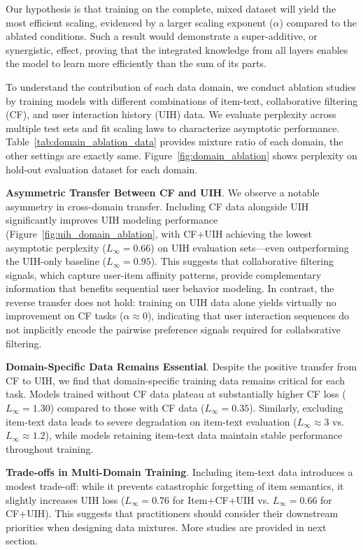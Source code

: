 \documentclass[]{fairmeta}
\begin{document}
Our hypothesis is that training on the complete, mixed dataset will yield the most efficient scaling, evidenced by a larger scaling exponent ($\alpha$) compared to the ablated conditions. Such a result would demonstrate a super-additive, or synergistic, effect, proving that the integrated knowledge from all layers enables the model to learn more efficiently than the sum of its parts.

 To understand the contribution of each data domain, we conduct ablation studies by training models with different combinations of item-text, collaborative filtering (CF), and user interaction history (UIH) data. We evaluate perplexity across multiple test sets and fit scaling laws to characterize asymptotic performance. Table~\ref{tab:domain_ablation_data} provides mixture ratio of each domain, the other settings are exactly same. Figure~\ref{fig:domain_ablation} shows perplexity on hold-out evaluation dataset for each domain.

 \textbf{Asymmetric Transfer Between CF and UIH}. We observe a notable asymmetry in cross-domain transfer. Including CF data alongside UIH significantly improves UIH modeling performance (Figure~\ref{fig:uih_domain_ablation}, with CF+UIH achieving the lowest asymptotic perplexity ($L_\infty=0.66$) on UIH evaluation sets—even outperforming the UIH-only baseline ($L_\infty=0.95$). This suggests that collaborative filtering signals, which capture user-item affinity patterns, provide complementary information that benefits sequential user behavior modeling. In contrast, the reverse transfer does not hold: training on UIH data alone yields virtually no improvement on CF tasks ($\alpha\approx 0$), indicating that user interaction sequences do not implicitly encode the pairwise preference signals required for collaborative filtering.

 \textbf{Domain-Specific Data Remains Essential}. Despite the positive transfer from CF to UIH, we find that domain-specific training data remains critical for each task. Models trained without CF data plateau at substantially higher CF loss ($L_\infty=1.30$) compared to those with CF data ($L_\infty=0.35$). Similarly, excluding item-text data leads to severe degradation on item-text evaluation ($L_\infty\approx3$ vs. $L_\infty\approx1.2$), while models retaining item-text data maintain stable performance throughout training.
 
 \textbf{Trade-offs in Multi-Domain Training}. Including item-text data introduces a modest trade-off: while it prevents catastrophic forgetting of item semantics, it slightly increases UIH loss ($L_\infty=0.76$ for Item+CF+UIH vs. $L_\infty=0.66$ for CF+UIH). This suggests that practitioners should consider their downstream priorities when designing data mixtures. More studies are provided in next section.
\end{document}
